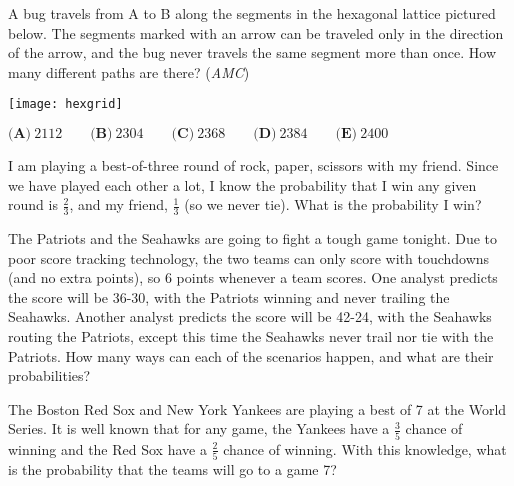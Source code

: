 		\begin{problem}
		A bug travels from A to B along the segments in the hexagonal lattice pictured below. The segments marked with an arrow can be traveled only in the direction of the arrow, and the bug never travels the same segment more than once. How many different paths are there? (\textit{AMC})
        \begin{center}
        \texttt{[image: hexgrid]}
        \end{center}
        $\textbf{(A)}\ 2112\qquad\textbf{(B)}\ 2304\qquad\textbf{(C)}\ 2368\qquad\textbf{(D)}\ 2384\qquad\textbf{(E)}\ 2400$
		\end{problem}
		
		\begin{problem}
		I am playing a best-of-three round of rock, paper, scissors with my friend. Since we have played each other a lot, I know the probability that I win any given round is $\frac{2}{3}$, and my friend, $\frac{1}{3}$ (so we never tie). What is the probability I win?
	    \end{problem}
		
		\begin{problem}
		The Patriots and the Seahawks are going to fight a tough game tonight. Due to poor score tracking technology, the two teams can only score with touchdowns (and no extra points), so 6 points whenever a team scores. One analyst predicts the score will be 36-30, with the Patriots winning and never trailing the Seahawks. Another analyst predicts the score will be 42-24, with the Seahawks routing the Patriots, except this time the Seahawks never trail nor tie with the Patriots. How many ways can each of the scenarios happen, and what are their probabilities?
		\end{problem}
		
		\begin{problem}
		The Boston Red Sox and New York Yankees are playing a best of 7 at the World Series. It is well known that for any game, the Yankees have a $\frac{3}{5}$ chance of winning and the Red Sox have a $\frac{2}{5}$ chance of winning. With this knowledge, what is the probability that the teams will go to a game 7?
		\end{problem}